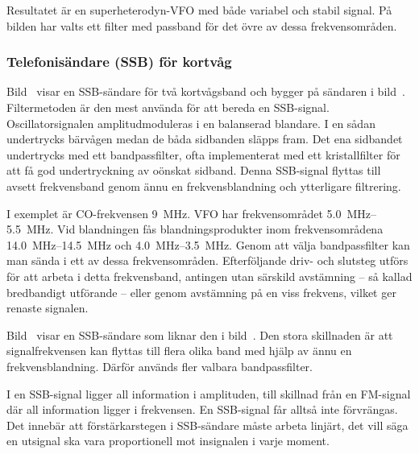 Resultatet är en superheterodyn-VFO med både variabel och stabil
signal.
På bilden har valts ett filter med passband för det övre av dessa
frekvensområden.

\subsubsection{Telefonisändare (SSB) för kortvåg}


Bild~ visar en SSB-sändare för två kortvågsband och
bygger på sändaren i bild~.
Filtermetoden är den mest använda för att bereda en SSB-signal.
Oscillatorsignalen amplitudmoduleras i en balanserad blandare.
I en sådan undertrycks bärvågen medan de båda sidbanden släpps fram.
Det ena sidbandet undertrycks med ett bandpassfilter, ofta implementerat med
ett kristallfilter för att få god undertryckning av oönskat sidband.
Denna SSB-signal flyttas till avsett frekvensband
genom ännu en frekvensblandning och ytterligare filtrering.

I exemplet är CO-frekvensen \qty{9}{\mega\hertz}.
VFO har frekvensområdet \SIrange{5,0}{5,5}{\mega\hertz}.
Vid blandningen fås blandningsprodukter inom frekvensområdena
\SIrange{14,0}{14,5}{\mega\hertz} och \SIrange{4,0}{3,5}{\mega\hertz}.
Genom att välja bandpassfilter kan man sända i ett av dessa frekvensområden.
Efterföljande driv- och slutsteg utförs för att arbeta i detta frekvensband,
antingen utan särskild avstämning -- så kallad bredbandigt utförande -- eller
genom avstämning på en viss frekvens, vilket ger renaste signalen.

Bild~ visar en SSB-sändare som liknar den i
bild~.
Den stora skillnaden är att signalfrekvensen kan flyttas till flera olika band
med hjälp av ännu en frekvensblandning.
Därför används fler valbara bandpassfilter.

I en SSB-signal ligger all information i amplituden, till skillnad
från en FM-signal där all information ligger i frekvensen.
En SSB-signal får alltså inte förvrängas.
Det innebär att förstärkarstegen i SSB-sändare måste arbeta linjärt, det vill
säga en utsignal ska vara proportionell mot insignalen i varje moment.

